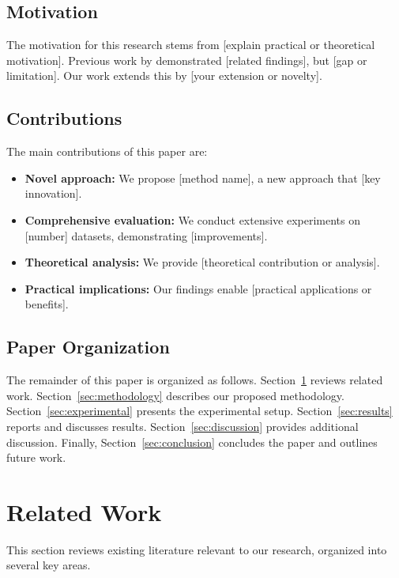 \documentclass[12pt,a4paper]{article}
\theoremstyle{definition}
\theoremstyle{remark}
\begin{document}
\subsection{Motivation}
\label{subsec:motivation}

The motivation for this research stems from [explain practical or theoretical motivation]. Previous work by \citet{reference2} demonstrated [related findings], but [gap or limitation]. Our work extends this by [your extension or novelty].

\subsection{Contributions}
\label{subsec:contributions}

The main contributions of this paper are:

\begin{itemize}
    \item \textbf{Novel approach:} We propose [method name], a new approach that [key innovation].
    \item \textbf{Comprehensive evaluation:} We conduct extensive experiments on [number] datasets, demonstrating [improvements].
    \item \textbf{Theoretical analysis:} We provide [theoretical contribution or analysis].
    \item \textbf{Practical implications:} Our findings enable [practical applications or benefits].
\end{itemize}

\subsection{Paper Organization}
\label{subsec:organization}

The remainder of this paper is organized as follows. Section~\ref{sec:related} reviews related work. Section~\ref{sec:methodology} describes our proposed methodology. Section~\ref{sec:experimental} presents the experimental setup. Section~\ref{sec:results} reports and discusses results. Section~\ref{sec:discussion} provides additional discussion. Finally, Section~\ref{sec:conclusion} concludes the paper and outlines future work.

\section{Related Work}
\label{sec:related}

This section reviews existing literature relevant to our research, organized into several key areas.
\end{document}

